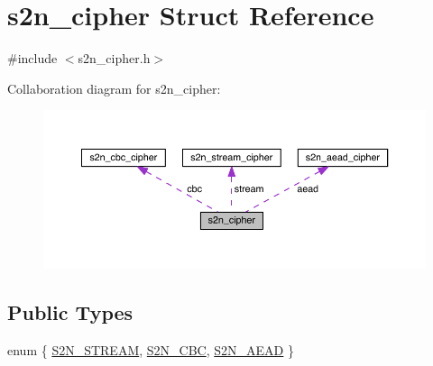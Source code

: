 \hypertarget{structs2n__cipher}{}\section{s2n\+\_\+cipher Struct Reference}
\label{structs2n__cipher}


{\ttfamily \#include $<$s2n\+\_\+cipher.\+h$>$}



Collaboration diagram for s2n\+\_\+cipher\+:\nopagebreak
\begin{figure}[H]
\begin{center}
\leavevmode
\includegraphics[width=350pt]{structs2n__cipher__coll__graph}
\end{center}
\end{figure}
\subsection*{Public Types}
\begin{DoxyCompactItemize}
\item 
enum \{ \hyperlink{structs2n__cipher_a99fb83031ce9923c84392b4e92f956b5a67a2e47925a8915cedd60c12c952a85d}{S2\+N\+\_\+\+S\+T\+R\+E\+AM}, 
\hyperlink{structs2n__cipher_a99fb83031ce9923c84392b4e92f956b5ab230bfe57512cd4305631ef6f92da966}{S2\+N\+\_\+\+C\+BC}, 
\hyperlink{structs2n__cipher_a99fb83031ce9923c84392b4e92f956b5ad3bf6902b630c4f86723fff6e6ce85f5}{S2\+N\+\_\+\+A\+E\+AD}
 \}
\end{DoxyCompactItemize}
